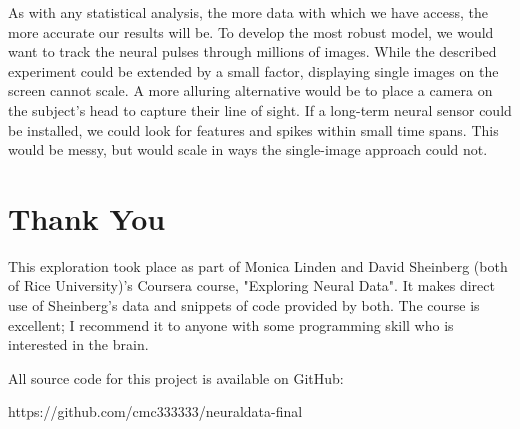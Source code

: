 \documentclass{scrartcl}
\begin{document}
As with any statistical analysis, the more data with which we have access, the
more accurate our results will be. To develop the most robust model, we would
want to track the neural pulses through millions of images. While the
described experiment could be extended by a small factor, displaying single
images on the screen cannot scale. A more alluring alternative would be to
place a camera on the subject's head to capture their line of sight. If a
long-term neural sensor could be installed, we could look for features and
spikes within small time spans. This would be messy, but would scale in ways
the single-image approach could not.

\section{Thank You}

This exploration took place as part of Monica Linden and David Sheinberg (both
of Rice University)'s Coursera course, "Exploring Neural Data". It makes
direct use of Sheinberg's data and snippets of code provided by both. The
course is excellent; I recommend it to anyone with some programming skill who
is interested in the brain.

All source code for this project is available on GitHub:

{\ttfamily https://github.com/cmc333333/neuraldata-final}
\end{document}
